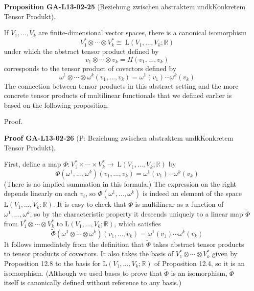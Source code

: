 \documentclass[10pt, letterpaper]{article}
\newcommand{\CustomHeading}[3]{%
  \par\medskip\noindent%
  \textbf{#1 #2} \textnormal{(#3)}.\enskip%
}
\newenvironment{PROP}[2]{\begin{unitbox}\CustomHeading{Proposition}{#1}{#2}}{\end{unitbox}}
\newenvironment{PROOF}[2]{\begin{unitbox}\CustomHeading{Proof}{#1}{#2}}{\end{unitbox}}
\begin{document}
\begin{PROP}{GA-L13-02-25}{Beziehung zwischen abstraktem undkKonkretem Tensor Produkt}
If $V_{1}, \ldots, V_{k}$ are finite-dimensional vector spaces, there is a canonical isomorphism
$$
V_{1}^{*} \otimes \cdots \otimes V_{k}^{*} \cong \mathrm{~L}\left(V_{1}, \ldots, V_{k} ; \mathbb{R}\right)
$$
under which the abstract tensor product defined by 
$$v_1 \otimes \cdots \otimes v_k=\Pi\left(v_1, \ldots, v_k\right)$$
corresponds to the tensor product of covectors defined by
$$\omega^1 \otimes \cdots \otimes \omega^k\left(v_1, \ldots, v_k\right)=\omega^1\left(v_1\right) \cdots \omega^k\left(v_k\right)$$
The connection between tensor products in this abstract setting and the more concrete tensor products of multilinear functionals that we defined earlier is based on the following proposition.
\end{PROP}


Proof. 

\begin{PROOF}{GA-L13-02-26}{P: Beziehung zwischen abstraktem undkKonkretem Tensor Produkt}
First, define a map $\Phi: V_{1}^{*} \times \cdots \times V_{k}^{*} \rightarrow \mathrm{~L}\left(V_{1}, \ldots, V_{k} ; \mathbb{R}\right)$ by
$$
\Phi\left(\omega^{1}, \ldots, \omega^{k}\right)\left(v_{1}, \ldots, v_{k}\right)=\omega^{1}\left(v_{1}\right) \cdots \omega^{k}\left(v_{k}\right)
$$
(There is no implied summation in this formula.) The expression on the right depends linearly on each $v_{i}$, so $\Phi\left(\omega^{1}, \ldots, \omega^{k}\right)$ is indeed an element of the space $\mathrm{L}\left(V_{1}, \ldots, V_{k} ; \mathbb{R}\right)$. It is easy to check that $\Phi$ is multilinear as a function of $\omega^{1}, \ldots, \omega^{k}$, so by the characteristic property it descends uniquely to a linear map $\widetilde{\Phi}$ from $V_{1}^{*} \otimes \cdots \otimes V_{k}^{*}$ to $\mathrm{L}\left(V_{1}, \ldots, V_{k} ; \mathbb{R}\right)$, which satisfies
$$
\widetilde{\Phi}\left(\omega^{1} \otimes \cdots \otimes \omega^{k}\right)\left(v_{1}, \ldots, v_{k}\right)=\omega^{1}\left(v_{1}\right) \cdots \omega^{k}\left(v_{k}\right)
$$
It follows immediately from the definition that $\widetilde{\Phi}$ takes abstract tensor products to tensor products of covectors. It also takes the basis of $V_{1}^{*} \otimes \cdots \otimes V_{k}^{*}$ given by Proposition 12.8 to the basis for $\mathrm{L}\left(V_{1}, \ldots, V_{k} ; \mathbb{R}\right)$ of Proposition 12.4, so it is an isomorphism. (Although we used bases to prove that $\widetilde{\Phi}$ is an isomorphism, $\widetilde{\Phi}$ itself is canonically defined without reference to any basis.)
\end{PROOF}
\end{document}
